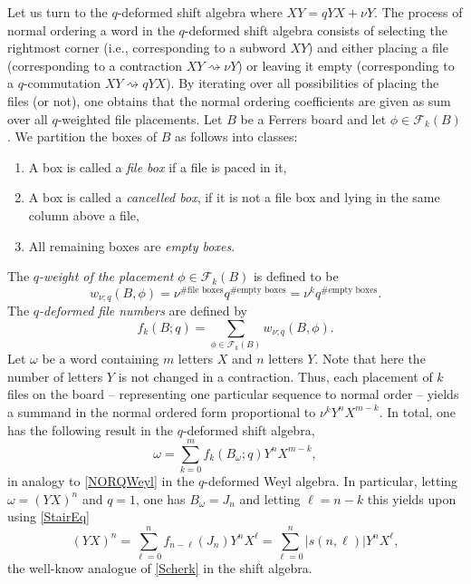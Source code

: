 \documentclass[10pt]{amsart}
\begin{document}
Let us turn to the $q$-deformed shift algebra where $XY=q YX+\nu Y$. The process of normal ordering a word in the $q$-deformed shift algebra consists of selecting the rightmost corner (i.e., corresponding to a subword $XY$) and either placing a file (corresponding to a contraction $XY \rightsquigarrow \nu Y$) or leaving it empty (corresponding to a $q$-commutation $XY \rightsquigarrow qYX $). By iterating over all possibilities of placing the files (or not), one obtains that the normal ordering coefficients are given as sum over all $q$-weighted file placements. Let $B$ be a Ferrers board and let $\phi \in \mathcal{F}_k(B)$. We partition the boxes of $B$ as follows into classes:
\begin{enumerate}
\item A box is called a {\em file box} if a file is paced in it,
\item A box is called a {\em cancelled box}, if it is not a file box and lying in the same column above a file,
\item All remaining boxes are {\em empty boxes}. 
\end{enumerate} 
The {\em $q$-weight of the placement} $\phi \in \mathcal{F}_k(B)$ is defined to be 
\begin{equation}
w_{\nu;q}(B,\phi)=\nu^{\# \mbox{file boxes}} q^{\# \mbox{empty boxes}}=\nu^{k} q^{\# \mbox{empty boxes}}.
\end{equation}
The {\em $q$-deformed file numbers} are defined by 
\begin{equation}
f_k(B;q)=\sum_{\phi \in \mathcal{F}_k(B)} w_{\nu;q}(B,\phi).
\end{equation}
 Let $\omega$ be a word containing $m$ letters $X$ and $n$ letters $Y$. Note that here the number of letters $Y$ is not changed in a contraction. Thus, each placement of $k$ files on the board -- representing one particular sequence to normal order --  yields a summand in the normal ordered form proportional to $\nu^k Y^{n}X^{m-k}$. In total, one has the following result in the $q$-deformed shift algebra, 
\begin{equation}\label{NORQShift}
\omega=\sum_{k=0}^{m} f_k(B_{\omega};q) Y^{n}X^{m-k},
\end{equation}
in analogy to \eqref{NORQWeyl} in the $q$-deformed Weyl algebra. In particular, letting $\omega=(YX)^n$ and $q=1$, one has $B_{\omega}=J_n$ and letting $\ell = n-k$ this yields upon using  \eqref{StairEq}
\begin{equation}\label{ShiftScherk}
(YX)^n=\sum_{\ell=0}^{n} f_{n-\ell}(J_n) Y^{n}X^{\ell}=\sum_{\ell=0}^{n}|s(n,\ell) |Y^{n}X^{\ell},
\end{equation}
the well-know analogue of \eqref{Scherk} in the shift algebra.
\end{document}
